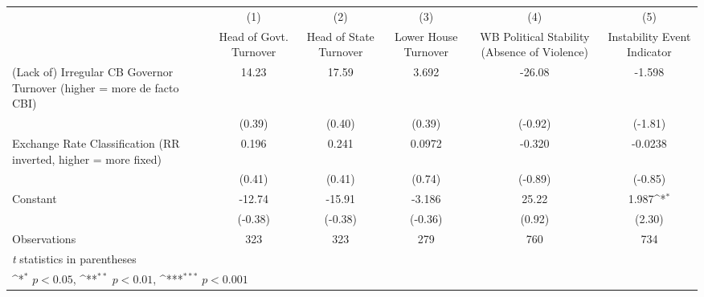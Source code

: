 {
\def\sym#1{\ifmmode^{#1}\else\(^{#1}\)\fi}
\begin{tabular*}{\linewidth}{@{\hskip\tabcolsep\extracolsep\fill}l*{5}{c}}
\hline\hline
                &\multicolumn{1}{c}{(1)}&\multicolumn{1}{c}{(2)}&\multicolumn{1}{c}{(3)}&\multicolumn{1}{c}{(4)}&\multicolumn{1}{c}{(5)}\\
                &\multicolumn{1}{c}{Head of Govt. Turnover}&\multicolumn{1}{c}{Head of State Turnover}&\multicolumn{1}{c}{Lower House Turnover}&\multicolumn{1}{c}{WB Political Stability (Absence of Violence)}&\multicolumn{1}{c}{Instability Event Indicator}\\
\hline
(Lack of) Irregular CB Governor Turnover (higher = more de facto CBI)&    14.23         &    17.59         &    3.692         &   -26.08         &   -1.598         \\
                &   (0.39)         &   (0.40)         &   (0.39)         &  (-0.92)         &  (-1.81)         \\
[1em]
Exchange Rate Classification (RR inverted, higher = more fixed)&    0.196         &    0.241         &   0.0972         &   -0.320         &  -0.0238         \\
                &   (0.41)         &   (0.41)         &   (0.74)         &  (-0.89)         &  (-0.85)         \\
[1em]
Constant        &   -12.74         &   -15.91         &   -3.186         &    25.22         &    1.987\sym{*}  \\
                &  (-0.38)         &  (-0.38)         &  (-0.36)         &   (0.92)         &   (2.30)         \\
\hline
Observations    &      323         &      323         &      279         &      760         &      734         \\
\hline\hline
\multicolumn{6}{l}{\footnotesize \textit{t} statistics in parentheses}\\
\multicolumn{6}{l}{\footnotesize \sym{*} \(p<0.05\), \sym{**} \(p<0.01\), \sym{***} \(p<0.001\)}\\
\end{tabular*}
}
